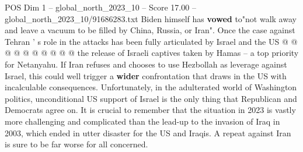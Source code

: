 \begin{textsample}{POS Dim 1 – global\_north\_2023\_10 – Score 17.00 – global\_north\_2023\_10/91686283.txt}
Biden himself has \textbf{vowed} to"not walk away and leave a vacuum to be filled by China, Russia, or Iran".
Once the case against Tehran ' s role in the attacks has been fully articulated by Israel and the US @ @ @ @ @ @ @ @ @ @ the release of Israeli captives taken by Hamas -- a top priority for Netanyahu.
If Iran refuses and chooses to use Hezbollah as leverage against Israel, this could well trigger a \textbf{wider} confrontation that draws in the US with incalculable consequences.
Unfortunately, in the adulterated world of Washington politics, unconditional US support of Israel is the only thing that Republican and Democrats agree on.
It is crucial to remember that the situation in 2023 is vastly more challenging and complicated than the lead-up to the invasion of Iraq in 2003, which ended in utter disaster for the US and Iraqis.
A repeat against Iran is sure to be far worse for all concerned.

\end{textsample}
